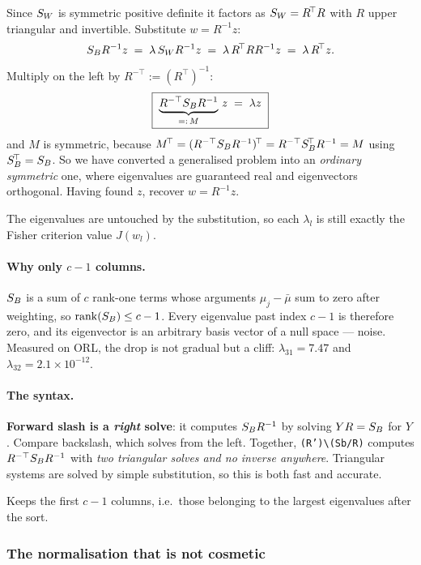 Since $S_W$ is symmetric positive definite it factors as $S_W = R^{\!\top}R$
with $R$ upper triangular and invertible. Substitute $w = R^{-1}z$:
\[
  S_B R^{-1}z \;=\; \lambda\,S_W R^{-1}z \;=\; \lambda\,R^{\!\top}R R^{-1} z
  \;=\; \lambda\,R^{\!\top}z .
\]
Multiply on the left by $R^{-\top} := (R^{\!\top})^{-1}$:
\[
  \boxed{\;\underbrace{R^{-\top}S_B R^{-1}}_{=:\,M}\,z \;=\; \lambda z\;}
\]
and $M$ is symmetric, because
$M^{\!\top} = (R^{-\top}S_B R^{-1})^{\!\top} = R^{-\top}S_B^{\!\top}R^{-1} = M$
using $S_B^{\!\top} = S_B$. So we have converted a generalised problem into an
\emph{ordinary symmetric} one, where eigenvalues are guaranteed real and
eigenvectors orthogonal. Having found $z$, recover $w = R^{-1}z$.

The eigenvalues are untouched by the substitution, so each $\lambda_l$ is still
exactly the Fisher criterion value $J(w_l)$.

\paragraph{Why only $c-1$ columns.} $S_B$ is a sum of $c$ rank-one terms whose
arguments $\mu_j - \bar\mu$ sum to zero after weighting, so $\operatorname{rank}(S_B)\le c-1$.
Every eigenvalue past index $c-1$ is therefore zero, and its eigenvector is an
arbitrary basis vector of a null space --- noise. Measured on ORL, the drop is
not gradual but a cliff: $\lambda_{31} = 7.47$ and $\lambda_{32} = 2.1\times10^{-12}$.

\paragraph{The syntax.}
\begin{description}[leftmargin=*,style=nextline,nosep]
\item[\texttt{Sb / R}] \textbf{Forward slash is a \emph{right} solve}: it
  computes $S_B R^{-1}$ by solving $YR = S_B$ for $Y$. Compare backslash, which
  solves from the left. Together,
  \texttt{(R')\textbackslash(Sb/R)} computes $R^{-\top}S_B R^{-1}$ with
  \emph{two triangular solves and no inverse anywhere}. Triangular systems are
  solved by simple substitution, so this is both fast and accurate.
\item[\texttt{Z(:, 1:(c-1))}] Keeps the first $c-1$ columns, i.e.\ those
  belonging to the largest eigenvalues after the sort.
\end{description}

\subsubsection{The normalisation that is not cosmetic}

